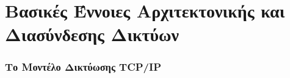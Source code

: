 %
%
\setcounter{chapter}{0}
\chapter{Βασικές Έννοιες Αρχιτεκτονικής και Διασύνδεσης Δικτύων}
\setcounter{section}{2}
\setcounter{subsection}{1}
\subsection{Το Μοντέλο Δικτύωσης TCP/IP}
